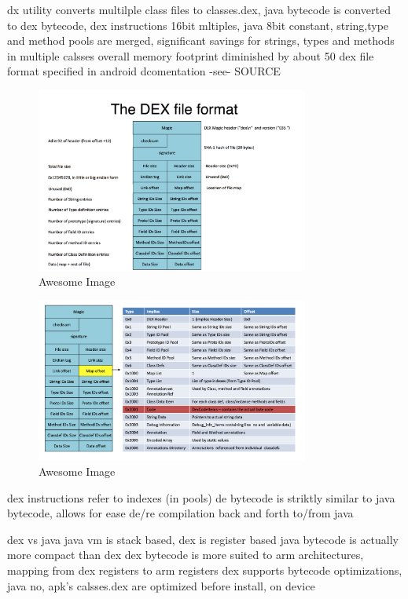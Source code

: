 %
dx utility converts multilple class files to classes.dex, java bytecode is converted to dex bytecode, dex instructions 16bit mltiples, java 8bit
constant, string,type and method pools are merged, significant savings for strings, types and methods in multiple calsses
overall memory footprint diminished by about 50%
dex file format specified in android dcomentation -see- SOURCE\newline
\begin{figure}[h]
    \centering
    \includegraphics[width=0.8\textwidth]{data/dex1.png}
    \caption{Awesome Image}
    \label{fig:awesome_image1}
\end{figure}
\begin{figure}[h]
    \centering
    \includegraphics[width=0.8\textwidth]{data/dex2.png}
    \caption{Awesome Image}
    \label{fig:awesome_image2}
\end{figure}
dex instructions refer to indexes (in pools)\newline
de bytecode is striktly similar to java bytecode, allows for ease de/re compilation back and forth to/from java\newline

dex vs java\newline
java vm is stack based, dex is register based
java bytecode is actually more compact than dex
dex bytecode is more suited to arm architectures, mapping from dex registers to arm registers
dex supports bytecode optimizations, java no, apk's calsses.dex are optimized before install, on device\newline
\cite{andevconDalvikART}
%

